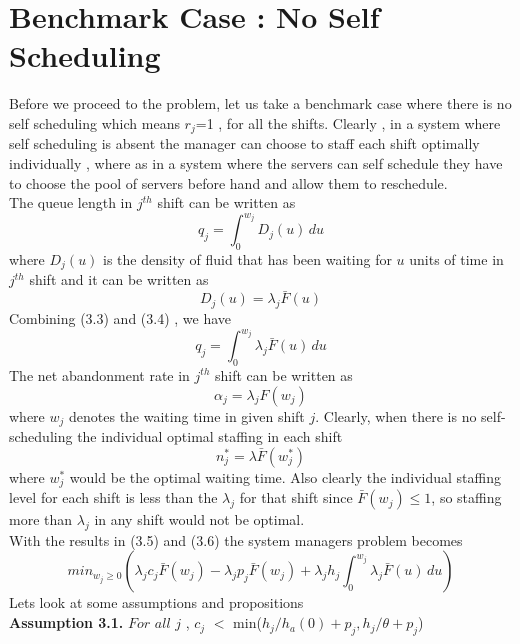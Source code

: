 \section{Benchmark Case : No Self Scheduling}
Before we proceed to the problem, let us take a benchmark case where there is no self scheduling which means $r_j$=1 , for all the shifts. Clearly , in a system where self scheduling is absent the manager can choose to staff each shift optimally individually , where as in a system where the servers can self schedule they have to choose the pool of servers before hand and allow them to reschedule.
\\ The queue length in $j^{th}$ shift can be written as 
\begin{equation}
    q_j = \int_{0}^{w_j} D_j(u) \, du
\end{equation}
where $D_j(u)$ is the density of fluid that has been waiting for $u$ units of time in $j^{th}$ shift and it can be written as
\begin{equation}
    D_j(u) = \lambda_j \bar{F}(u)
\end{equation}
 Combining (3.3) and (3.4) , we have 
 \begin{equation}
     q_j = \int_{0}^{w_j} \lambda_j \bar{F}(u)  \, du
 \end{equation}
  The net abandonment rate in $j^{th}$  shift can be written as
  \begin{equation}
      \alpha_j=\lambda_j F(w_j)
  \end{equation}
   where $w_j$ denotes the waiting time in given shift $j$.
 Clearly, when there is no self-scheduling the individual optimal staffing in each shift 
 \begin{equation}
     n_j^{*}=\lambda \bar{F}(w_j^{*})
 \end{equation}
  where $w_j^{*}$ would be the optimal waiting time. Also clearly the individual staffing level for each shift is less than the $\lambda_j$ for that shift since $\bar{F}(w_j) \leq 1$, so staffing more than $\lambda_j$ in any shift would not be optimal.
\\With the results in (3.5) and (3.6) the system managers problem becomes
\begin{equation}
    min_{w_j \geq 0} \left( \lambda_j c_j \bar{F}(w_j) - \lambda_j p_j \bar{F}(w_j) + \lambda_j h_j\int_{0}^{w_j} \lambda_j \bar{F}(u)  \, du \right)
\end{equation}
Lets look at some assumptions and propositions
\\ \textbf{ Assumption 3.1.} $For$ $all$ $j$ , $c_j$ $<$ min($h_j/h_a(0)+p_j,h_j/\theta+p_j$)
